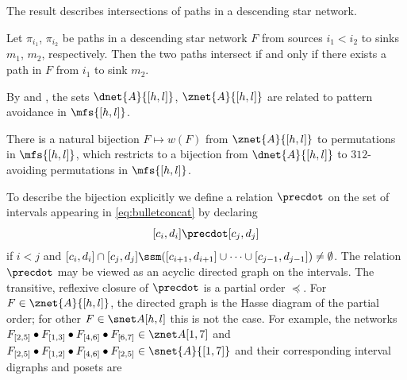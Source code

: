 The result \cite[Lem.\,3.5]{CHSSkanEKL}
describes intersections of paths in a descending star network.
\begin{lem}\label{l:lemma3.5}
  Let $\pi_{i_1}$, $\pi_{i_2}$ be paths in a descending star network $F$
  from sources $i_1 < i_2$ to sinks $m_1$, $m_2$, respectively.
  Then the two paths intersect if and only if there exists a path in $F$
  from $i_1$ to sink $m_2$.
  \end{lem}

By \cite[Thm.\,3.5, Lem.\,5.3]{SkanNNDCB}
and \cite[Thm.\,3.6]{CHSSkanEKL},
the sets
$\dnet{A}{[h,l]}$, $\znet{A}{[h,l]}$
are related to pattern avoidance in $\mfs{[h,l]}$.
\begin{prop}\label{p:anetpavoid}
There is a natural bijection $F \mapsto w(F)$ from 
$\znet{A}{[h,l]}$
to \pavoiding permutations in $\mfs{[h,l]}$,
which restricts to a bijection from $\dnet{A}{[h,l]}$ to
$312$-avoiding permutations in $\mfs{[h,l]}$.
\end{prop}
To describe
the bijection
explicitly
we
define
a relation $\precdot$
on the set of intervals appearing in \eqref{eq:bulletconcat}
by
declaring
\begin{equation}\label{eq:precdotdef}
  [c_i,d_i] \precdot [c_j,d_j]
  \end{equation}
if 
$i < j$ and
$[c_i,d_i] \cap [c_j,d_j] \ssm ( [c_{i+1},d_{i+1}] \cup \cdots \cup [c_{j-1},d_{j-1}]) \neq \emptyset$.
  The relation $\precdot$ may be viewed as an acyclic directed graph on 
  the intervals.
  The transitive, reflexive closure of $\precdot$ is a partial order $\preceq$.
  For $F \in \znet{A}{[h,l]}$, the directed graph is the Hasse diagram
  of the partial order; for other $F \in \snet A{[h,l]}$ this is not the case.
  For example, the networks
  $F_{[2,5]} \bullet F_{[1,3]} \bullet F_{[4,6]} \bullet F_{[6,7]}
  \in \znet A{[1,7]}$
  and
  $F_{[2,5]} \bullet F_{[1,2]} \bullet F_{[4,6]} \bullet F_{[2,5]}
  \in \snet{A}{[1,7]}$
and their corresponding interval digraphs and posets are
